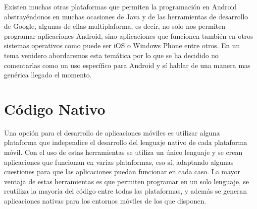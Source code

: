 \documentclass[
10pt, %
a4paper, %
oneside, %
headinclude,footinclude, %
BCOR5mm, %
]{scrartcl}
\begin{document}
Existen muchas otras plataformas que permiten la programación en Android abstrayéndonos en muchas ocasiones de Java y de las herramientas de desarrollo de Google, algunas de ellas multiplaforma, es decir, no solo nos permiten programar aplicaciones Android, sino aplicaciones que funcionen también en otros sistemas operativos como puede ser iOS o Windows Phone entre otros. En un tema venidero abordaremos esta temática por lo que se ha decidido no comentarlas como un uso específico para Android y sí hablar de una manera mas genérica llegado el momento.


\section{Código Nativo}
Una opción para el desarrollo de aplicaciones móviles es utilizar alguna plataforma que independice el desarrollo del lenguaje nativo de cada plataforma móvil. Con el uso de estas herramientas se utiliza un único lenguaje y se crean aplicaciones que funcionan en varias plataformas, eso sí, adaptando algunas cuestiones para que las aplicaciones puedan funcionar en cada caso. La mayor ventaja de estas herramientas es que permiten programar en un solo lenguaje, se reutiliza la mayoría del código entre todas las plataformas, y además se generan aplicaciones nativas para los entornos móviles de los que disponen.
\end{document}
